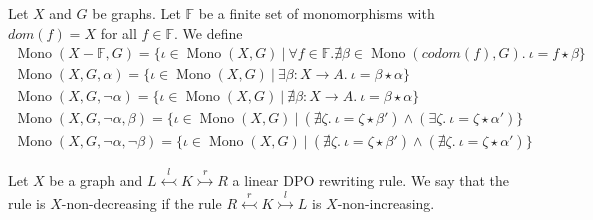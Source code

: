 \begin{remark}[Notation]
    Let $X$ and $G$ be graphs. Let $\mathbb{F}$ be a finite set of monomorphisms with $dom(f) = X$ for all $f \in \mathbb{F}$. We define
    \begin{align*}
        \operatorname{Mono}(X-\mathbb{F},G) = \{ \iota \in \operatorname{Mono}(X,G) \ | \ \forall f \in \mathbb{F}. \nexists \beta \in \operatorname{Mono}(codom(f),G).~\iota = f \star \beta \} 
        \\
        \operatorname{Mono}(X,G,\alpha) = \{ \iota \in \operatorname{Mono}(X,G) \ | \ \exists \beta : X \to A.~\iota = \beta \star \alpha \} 
        \\
        \operatorname{Mono}(X,G,\lnot \alpha) = \{ \iota \in \operatorname{Mono}(X,G) \ | \ \nexists \beta : X \to A.  ~\iota = \beta \star \alpha \} 
        \\
        \operatorname{Mono}(X,G, \lnot \alpha, \beta) = \{ 
            \iota \in  \operatorname{Mono}(X,G) \ | \ (\nexists \zeta. ~\iota = \zeta \star \beta') \land (\exists \zeta.~\iota = \zeta \star \alpha')
        \}
        \\
        \operatorname{Mono}(X,G,\lnot \alpha, \lnot \beta) = \{ 
            \iota \in \operatorname{Mono}(X,G) \ | \ (\nexists \zeta. ~\iota = \zeta \star \beta') \land (\nexists \zeta.~\iota = \zeta \star \alpha')
        \}
        \end{align*}
\end{remark}

\begin{definition}
    Let $X$ be a graph and $L \overset{l}{\leftarrowtail} K \overset{r}{\rightarrowtail} R$ a linear DPO rewriting rule. We say that the rule is $X$-non-decreasing if the rule 
    $R \overset{r}{\leftarrowtail} K \overset{l}{\rightarrowtail} L$ is $X$-non-increasing. 
\end{definition}


